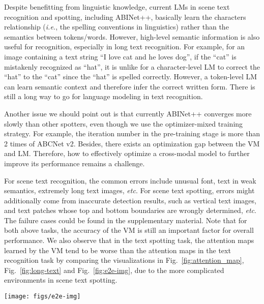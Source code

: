 \documentclass[10pt,journal,compsoc]{IEEEtran}
\def\ie{{\it i.e.}\xspace}
\def\etc{{\it etc}\xspace}
\begin{document}
Despite benefitting from linguistic knowledge, current LMs in scene text recognition and spotting, including ABINet++, basically learn the characters relationship (\ie, the spelling conventions in linguistics) rather than the semantics between tokens/words. However, high-level semantic information is also useful for recognition, especially in long text recognition. For example, for an image containing a text string ``I love cat and he loves dog'', if the ``cat'' is mistakenly recognized as ``hat'', it is unlike for a character-level LM to correct the ``hat'' to the ``cat'' since the ``hat'' is spelled correctly. However, a token-level LM can learn semantic context and therefore infer the correct written form. There is still a long way to go for language modeling in text recognition.

Another issue we should point out is that currently ABINet++ converges more slowly than other spotters, even though we use the optimizer-mixed training strategy. For example, the iteration number in the pre-training stage is more than 2 times of ABCNet v2. Besides, there exists an optimization gap between the VM and LM. Therefore, how to effectively optimize a cross-modal model to further improve its performance remains a challenge.

For scene text recognition, the common errors include unusual font, text in weak semantics, extremely long text images, \etc. For scene text spotting, errors might additionally come from inaccurate detection results, such as vertical text images, and text patches whose top and bottom boundaries are wrongly determined, \etc. The failure cases could be found in the supplementary material. Note that for both above tasks, the accuracy of the VM is still an important factor for overall performance. We also observe that in the text spotting task, the attention maps learned by the VM tend to be worse than the attention maps in the text recognition task by comparing the visualizations in Fig.~\ref{fig:attention_map}, Fig.~\ref{fig:long-text} and Fig.~\ref{fig:e2e-img}, due to the more complicated environments in scene text spotting.


\begin{figure*}
   \begin{center}
      \texttt{[image: figs/e2e-img]}
      \caption{\textbf{Qualitative text spotting results of ABINet++ on various datasets.} The attention maps are also restored for visualization.}
      \label{fig:e2e-img}
   \end{center}
   \vspace{-1em}
 \end{figure*}
\end{document}

